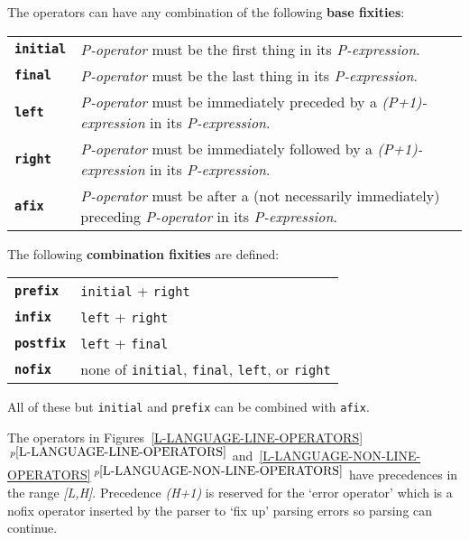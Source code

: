 \documentclass[12pt]{article}
\newcommand{\key}[1]{{\rm \bfseries #1}}
\newcommand{\ttkey}[1]{{\tt \bfseries #1}}
\newcommand{\itemref}[1]{\ref{#1}$\,^{p\pageref{#1}}$}
\begin{document}
\newpage

The operators can have any combination of the following \key{base fixities}:

\begin{center}
\begin{tabular}{lp{5.0in}}
\ttkey{initial}	& {\em P-operator} must be the first thing
                  in its {\em P-expression}. \\
\ttkey{final}	& {\em P-operator} must be the last thing
                  in its {\em P-expression}. \\
\ttkey{left}	& {\em P-operator} must be immediately
                  preceded by a {\em (P+1)-expression}
                  in its {\em P-expression}. \\
\ttkey{right}	& {\em P-operator} must be immediately
                  followed by a {\em (P+1)-expression}
                  in its {\em P-expression}. \\
\ttkey{afix}	& {\em P-operator} must be after a (not necessarily
                  immediately) preceding {\em P-operator}
                  in its {\em P-expression}. \\
\end{tabular}
\end{center}

The following \key{combination fixities} are defined:

\begin{center}
\begin{tabular}{ll}
\ttkey{prefix}	& {\tt initial} + {\tt right} \\
\ttkey{infix}	& {\tt left} + {\tt right} \\
\ttkey{postfix}	& {\tt left} + {\tt final} \\
\ttkey{nofix}	& none of {\tt initial}, {\tt final}, {\tt left},
                  or {\tt right} \\
\end{tabular}
\end{center}

All of these but {\tt initial} and {\tt prefix} can be combined with {\tt afix}.

The operators in
Figures~\itemref{L-LANGUAGE-LINE-OPERATORS}
and~\itemref{L-LANGUAGE-NON-LINE-OPERATORS}
have precedences in
the range {\em [L,H]}.
Precedence {\em (H+1)} is reserved for the `error operator' which is a
nofix operator inserted by the parser to `fix up' parsing errors
so parsing can continue.
\end{document}
